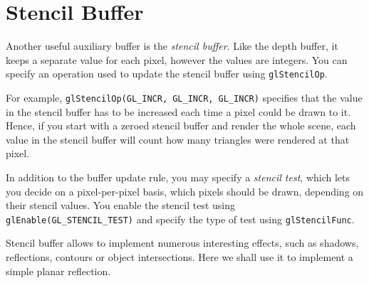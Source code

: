 \documentclass{article}
\begin{document}
\section{Stencil Buffer}
Another useful auxiliary buffer is the \emph{stencil buffer}. Like the depth buffer, it keeps a separate value for each pixel, however the values are integers. You can specify an operation used to update the stencil buffer using \texttt{glStencilOp}. 

For example, \verb#glStencilOp(GL_INCR, GL_INCR, GL_INCR)# specifies that the value in the stencil buffer has to be increased each time a pixel could be drawn to it. Hence, if you start with a zeroed stencil buffer and render the whole scene, each value in the stencil buffer will count how many triangles were rendered at that pixel.

In addition to the buffer update rule, you may specify a \emph{stencil test}, which lets you decide on a pixel-per-pixel basis, which pixels should be drawn, depending on their stencil values. You enable the stencil test using \\ \verb#glEnable(GL_STENCIL_TEST)# and specify the type of test using \verb#glStencilFunc#.

Stencil buffer allows to implement numerous interesting effects, such as shadows, reflections, contours or object intersections. Here we shall use it to implement a simple planar reflection.
\end{document}

